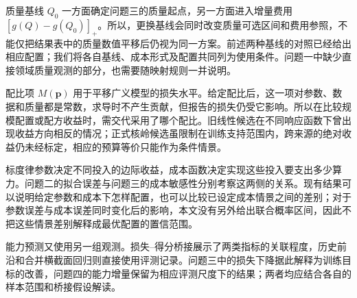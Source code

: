 质量基线 $Q_0$ 一方面确定问题三的质量起点，另一方面进入增量费用 $[g(Q)-g(Q_0)]_+$。所以，更换基线会同时改变质量可选区间和费用参照，不能仅把结果表中的质量数值平移后仍视为同一方案。前述两种基线的对照已经给出相应配置；我们将各自基线、成本形式及配置共同列为使用条件。问题一中缺少直接领域质量观测的部分，也需要随映射规则一并说明。

配比项 $M(\bm p)$ 用于平移广义模型的损失水平。给定配比后，这一项对参数、数据和质量都是常数，求导时不产生贡献，但报告的损失仍受它影响。所以在比较规模配置或配方收益时，需交代采用了哪个配比。旧线性候选在不同响应函数下曾出现收益方向相反的情况；正式核岭候选虽限制在训练支持范围内，跨来源的绝对收益仍未经标定，相应的预算等价只能作为条件情景。

标度律参数决定不同投入的边际收益，成本函数决定实现这些投入要支出多少算力。问题二的拟合误差与问题三的成本敏感性分别考察这两侧的关系。现有结果可以说明给定参数和成本下怎样配置，也可以比较已设定成本情景之间的差别；对于参数误差与成本误差同时变化后的影响，本文没有另外给出联合概率区间，因此不把这些情景差别解释成最优配置的置信范围。

能力预测又使用另一组观测。损失--得分桥接展示了两类指标的关联程度，历史前沿和合并横截面回归则直接使用评测记录。问题三中的损失下降据此解释为训练目标的改善，问题四的能力增量保留为相应评测尺度下的结果；两者均应结合各自的样本范围和桥接假设解读。
